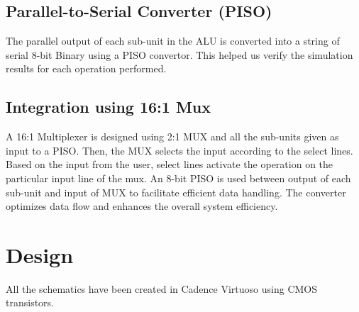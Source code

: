 \documentclass[conference]{IEEEtran}
\begin{document}
\subsection{Parallel-to-Serial Converter (PISO)}\label{CC}
The parallel output of each sub-unit in the ALU is converted into a string of serial 8-bit Binary using a PISO convertor. This helped us verify the simulation results for each operation performed.

\subsection{Integration using 16:1 Mux}\label{CD}
A 16:1 Multiplexer is designed using 2:1 MUX and all the sub-units given as input to a PISO. Then, the MUX selects the input according to the select lines. Based on the input from the user, select lines activate the operation on the particular input line of the mux.
An 8-bit PISO is used between output of each sub-unit and input of MUX to facilitate efficient data handling. The converter optimizes data flow and enhances the overall system efficiency.
\\ 

\section{Design}\label{D}
All the schematics have been created in Cadence Virtuoso using CMOS transistors.
\end{document}
